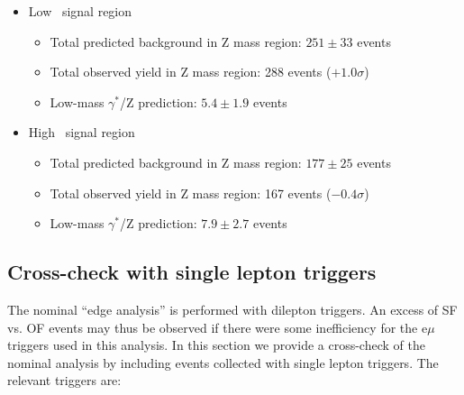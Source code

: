 \begin{itemize}
\item Low \MET\ signal region
\begin{itemize}
  \item Total predicted background in Z mass region: $251\pm33$ events
  \item Total observed yield in Z mass region: 288 events ($+1.0\sigma$)
  \item Low-mass $\gamma^*$/Z prediction: $5.4\pm1.9$ events
\end{itemize}
\item High \MET\ signal region
\begin{itemize}
  \item Total predicted background in Z mass region: $177\pm25$ events
  \item Total observed yield in Z mass region: 167 events ($-0.4\sigma$)
  \item Low-mass $\gamma^*$/Z prediction: $7.9\pm2.7$ events
\end{itemize}
\end{itemize}

\clearpage

\subsection{Cross-check with single lepton triggers}
\label{sec:edge_triggers}

The nominal ``edge analysis'' is performed with dilepton triggers. An excess of SF vs. OF events may thus be observed if there
were some inefficiency for the e$\mu$ triggers used in this analysis. In this section we provide a cross-check of the nominal
analysis by including events collected with single lepton triggers. The relevant triggers are:

